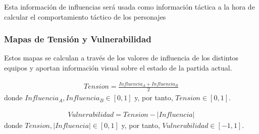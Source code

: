 
Esta información de influencias será usada como información táctica a la hora de calcular el comportamiento táctico de los personajes

\subsubsection{Mapas de Tensión y Vulnerabilidad}

Estos mapas se calculan a través de los valores de influencia de los distintos equipos y aportan información visual sobre el estado de la partida actual.

\begin{gather*}
    Tension = \frac{Influencia_A + Influencia_B}{2}
\end{gather*}
donde $Influencia_A, Influencia_B \in [0,1]$ y, por tanto, $Tension \in [0, 1]$.

\begin{gather*}
    Vulnerabilidad = Tension - \lvert Influencia \rvert
\end{gather*}
donde $Tension, \lvert Influencia \rvert \in [0,1]$ y, por tanto, $Vulnerabilidad \in [-1, 1]$.


